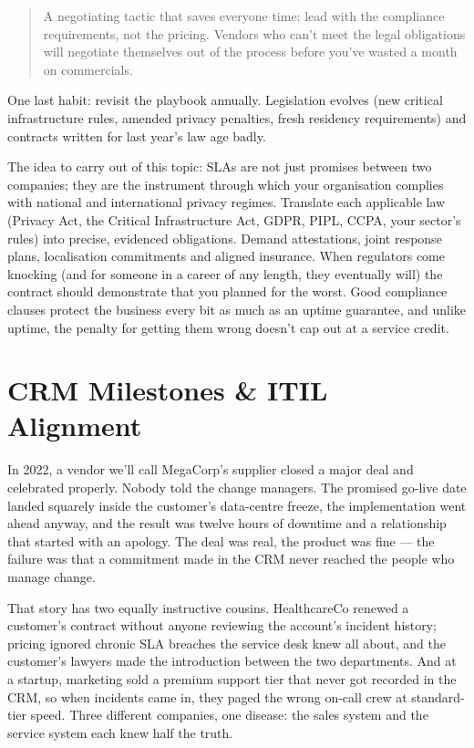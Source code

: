 \begin{quote}\small
A negotiating tactic that saves everyone time: lead with the compliance requirements, not the pricing. Vendors who can't meet the legal obligations will negotiate themselves out of the process before you've wasted a month on commercials.
\end{quote}


One last habit: revisit the playbook annually. Legislation evolves (new critical infrastructure rules, amended privacy penalties, fresh residency requirements) and contracts written for last year's law age badly.


The idea to carry out of this topic: SLAs are not just promises between two companies; they are the instrument through which your organisation complies with national and international privacy regimes. Translate each applicable law (Privacy Act, the Critical Infrastructure Act, GDPR, PIPL, CCPA, your sector's rules) into precise, evidenced obligations. Demand attestations, joint response plans, localisation commitments and aligned insurance. When regulators come knocking (and for someone in a career of any length, they eventually will) the contract should demonstrate that you planned for the worst. Good compliance clauses protect the business every bit as much as an uptime guarantee, and unlike uptime, the penalty for getting them wrong doesn't cap out at a service credit.

\section{CRM Milestones \& ITIL Alignment}
In 2022, a vendor we'll call MegaCorp's supplier closed a major deal and celebrated properly. Nobody told the change managers. The promised go-live date landed squarely inside the customer's data-centre freeze, the implementation went ahead anyway, and the result was twelve hours of downtime and a relationship that started with an apology. The deal was real, the product was fine — the failure was that a commitment made in the CRM never reached the people who manage change.


That story has two equally instructive cousins. HealthcareCo renewed a customer's contract without anyone reviewing the account's incident history; pricing ignored chronic SLA breaches the service desk knew all about, and the customer's lawyers made the introduction between the two departments. And at a startup, marketing sold a premium support tier that never got recorded in the CRM, so when incidents came in, they paged the wrong on-call crew at standard-tier speed. Three different companies, one disease: the sales system and the service system each knew half the truth.


